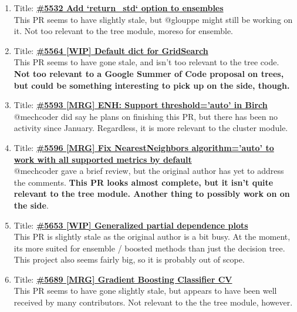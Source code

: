 \documentclass[12pt, oneside]{article}
\begin{document}
\begin{enumerate}
  \item
  Title:
  \textbf{\href{https://github.com/scikit-learn/scikit-learn/pull/5532}
    {\#5532 Add `return\_std` option to ensembles}}\\
  This PR seems to have slightly stale, but @glouppe might still be
  working on it. Not too relevant to the tree module, moreso for
  ensemble.

  \item
  Title:
  \textbf{\href{https://github.com/scikit-learn/scikit-learn/pull/5564}
    {\#5564 [WIP] Default dict for GridSearch}}\\
  This PR seems to have gone stale, and isn't too relevant to the tree
  code. \textbf{Not too relevant to a Google Summer of Code proposal on trees, but
    could be something interesting to pick up on the side, though.}

  \item
  Title:
  \textbf{\href{https://github.com/scikit-learn/scikit-learn/pull/5593}
    {\#5593 [MRG] ENH: Support threshold='auto' in Birch}}\\
  @mechcoder did say he plans on finishing this PR, but there has been
  no activity since January. Regardless, it is more relevant to the
  cluster module.

  \item
  Title:
  \textbf{\href{https://github.com/scikit-learn/scikit-learn/pull/5596}
    {\#5596 [MRG] Fix NearestNeighbors algorithm='auto' to work with
      all supported metrics by default}}\\
  @mechcoder gave a brief review, but the original author has yet to
  address the comments. \textbf{This PR looks almost complete, but it
    isn't quite relevant to the tree module. Another thing to possibly
    work on on the side}.

  \item
  Title:
  \textbf{\href{https://github.com/scikit-learn/scikit-learn/pull/5653}
    {\#5653 [WIP] Generalized partial dependence plots}}\\
  This PR is slightly stale as the original author is a bit busy. At
  the moment, its more suited for ensemble / boosted methods than just
  the decision tree. This project also seems fairly big, so it
  is probably out of scope.

  \item
  Title:
  \textbf{\href{https://github.com/scikit-learn/scikit-learn/pull/5689}
    {\#5689 [MRG] Gradient Boosting Classifier CV}}\\
  This PR seems to have gone slightly stale, but appears to have been
  well received by many contributors. Not relevant to the the tree
  module, however.


\end{enumerate}
\end{document}
